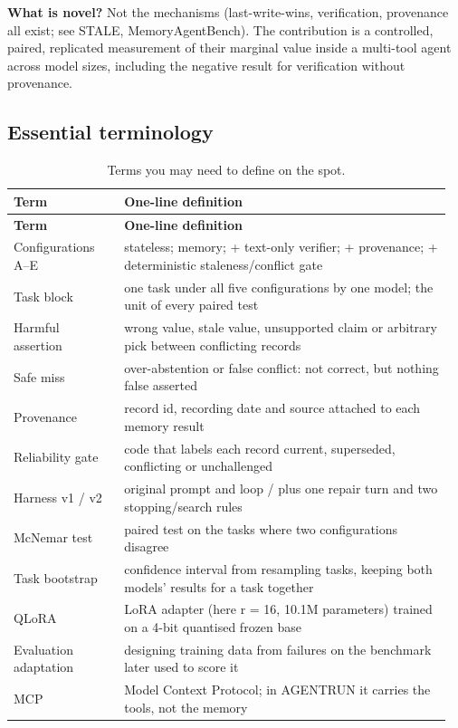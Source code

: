 \documentclass[10pt,a4paper]{article}
\begin{document}
\textbf{What is novel?} Not the mechanisms (last-write-wins, verification, provenance all exist; see STALE, MemoryAgentBench). The contribution is a controlled, paired, replicated measurement of their marginal value inside a multi-tool agent across model sizes, including the negative result for verification without provenance.

\subsection*{Essential terminology}
\begingroup\small\setlength{\tabcolsep}{4pt}\renewcommand{\arraystretch}{1.18}
\begin{longtable}{>{\raggedright\arraybackslash}p{0.243\linewidth}>{\raggedright\arraybackslash}p{0.717\linewidth}}
\caption{Terms you may need to define on the spot.}\\
\toprule
\textbf{Term} & \textbf{One-line definition} \\
\midrule
\endfirsthead
\toprule
\textbf{Term} & \textbf{One-line definition} \\
\midrule
\endhead
\bottomrule
\endlastfoot
Configurations A–E & stateless; memory; + text-only verifier; + provenance; + deterministic staleness/conflict gate \\
Task block & one task under all five configurations by one model; the unit of every paired test \\
Harmful assertion & wrong value, stale value, unsupported claim or arbitrary pick between conflicting records \\
Safe miss & over-abstention or false conflict: not correct, but nothing false asserted \\
Provenance & record id, recording date and source attached to each memory result \\
Reliability gate & code that labels each record current, superseded, conflicting or unchallenged \\
Harness v1 / v2 & original prompt and loop / plus one repair turn and two stopping/search rules \\
McNemar test & paired test on the tasks where two configurations disagree \\
Task bootstrap & confidence interval from resampling tasks, keeping both models' results for a task together \\
QLoRA & LoRA adapter (here r = 16, 10.1M parameters) trained on a 4-bit quantised frozen base \\
Evaluation adaptation & designing training data from failures on the benchmark later used to score it \\
MCP & Model Context Protocol; in AGENTRUN it carries the tools, not the memory \\
\end{longtable}
\endgroup
\end{document}
